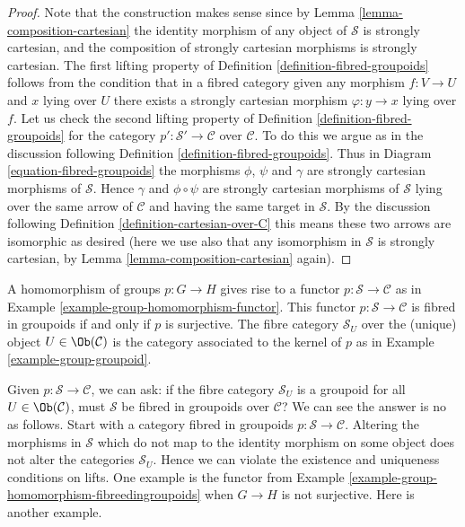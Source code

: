 \begin{proof}
Note that the construction makes sense since by
Lemma \ref{lemma-composition-cartesian}
the identity morphism of any object of $\mathcal{S}$ is strongly cartesian,
and the composition of strongly cartesian morphisms is strongly cartesian.
The first lifting property of
Definition \ref{definition-fibred-groupoids}
follows from the condition that in a fibred category
given any morphism $f : V \to U$ and $x$ lying over $U$ there exists
a strongly cartesian morphism $\varphi : y \to x$ lying over $f$.
Let us check the second lifting property of
Definition \ref{definition-fibred-groupoids}
for the category $p' : \mathcal{S}' \to \mathcal{C}$ over $\mathcal{C}$.
To do this we argue as in the discussion following
Definition \ref{definition-fibred-groupoids}.
Thus in Diagram \ref{equation-fibred-groupoids} the
morphisms $\phi$, $\psi$ and $\gamma$ are strongly cartesian morphisms
of $\mathcal{S}$.
Hence $\gamma$ and $\phi \circ \psi$ are strongly cartesian morphisms
of $\mathcal{S}$ lying over the same arrow of $\mathcal{C}$ and
having the same target in $\mathcal{S}$. By the discussion following
Definition \ref{definition-cartesian-over-C}
this means these two arrows are isomorphic as desired (here we use also
that any isomorphism in $\mathcal{S}$ is strongly cartesian, by
Lemma \ref{lemma-composition-cartesian} again).
\end{proof}

\begin{example}
\label{example-group-homomorphism-fibreedingroupoids}
A homomorphism of groups $p : G \to H$ gives rise to a functor
$p : \mathcal{S}\to\mathcal{C}$ as in Example
\ref{example-group-homomorphism-functor}. This functor
$p : \mathcal{S}\to\mathcal{C}$ is fibred in groupoids if and only if
$p$ is surjective.  The fibre category $\mathcal{S}_U$ over the (unique)
object $U\in \Ob(\mathcal{C})$ is the category associated to the
kernel of $p$ as in Example \ref{example-group-groupoid}.
\end{example}

\noindent
Given $p : \mathcal{S} \to \mathcal{C}$, we can ask: if the fibre
category $\mathcal{S}_U$ is a groupoid for all $U \in \Ob(\mathcal{C})$,
must $\mathcal{S}$ be fibred in groupoids over $\mathcal{C}$? We can see the
answer is no as follows. Start with a category fibred in groupoids
$p : \mathcal{S} \to \mathcal{C}$. Altering the morphisms in $\mathcal{S}$
which do not map to the identity morphism on some object does not alter the
categories $\mathcal{S}_U$. Hence we can violate the existence and uniqueness
conditions on lifts. One example is the functor from Example
\ref{example-group-homomorphism-fibreedingroupoids} when $G \to H$ is not
surjective. Here is another example.

